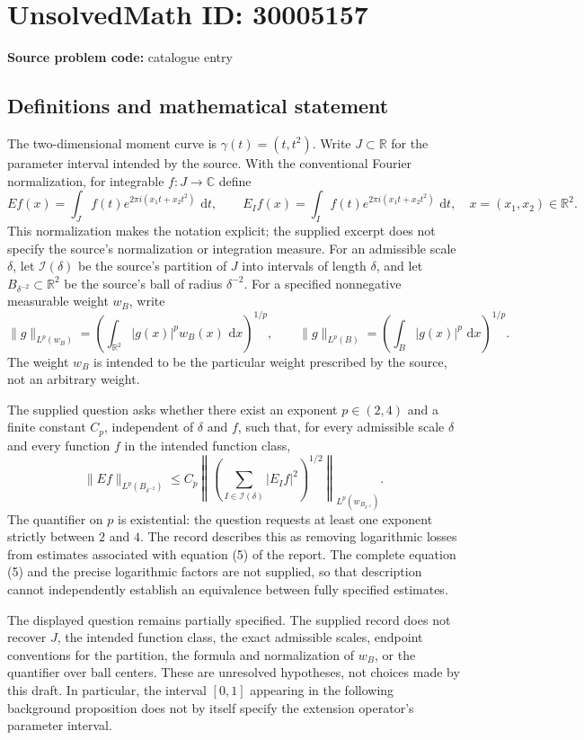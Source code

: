 \documentclass[11pt]{article}
\newcommand{\R}{\mathbb{R}}
\newcommand{\C}{\mathbb{C}}
\newcommand{\dd}{\,\mathrm{d}}
\begin{document}
\section*{UnsolvedMath ID: 30005157}
\textbf{Source problem code:} catalogue entry
\subsection{Definitions and mathematical statement}
The two-dimensional moment curve is \(\gamma(t)=(t,t^2)\). Write \(J\subset\R\) for the parameter interval intended by the source. With the conventional Fourier normalization, for integrable \(f:J\to\C\) define
\[
Ef(x)=\int_J f(t)e^{2\pi i(x_1t+x_2t^2)}\,\dd t,
\qquad
E_If(x)=\int_I f(t)e^{2\pi i(x_1t+x_2t^2)}\,\dd t,
\quad x=(x_1,x_2)\in\R^2.
\]
This normalization makes the notation explicit; the supplied excerpt does not specify the source's normalization or integration measure. For an admissible scale \(\delta\), let \(\mathcal I(\delta)\) be the source's partition of \(J\) into intervals of length \(\delta\), and let \(B_{\delta^{-2}}\subset\R^2\) be the source's ball of radius \(\delta^{-2}\). For a specified nonnegative measurable weight \(w_B\), write
\[
\|g\|_{L^p(w_B)}=\left(\int_{\R^2}|g(x)|^p w_B(x)\,\dd x\right)^{1/p},
\qquad
\|g\|_{L^p(B)}=\left(\int_B|g(x)|^p\,\dd x\right)^{1/p}.
\]
The weight \(w_B\) is intended to be the particular weight prescribed by the source, not an arbitrary weight.

The supplied question asks whether there exist an exponent \(p\in(2,4)\) and a finite constant \(C_p\), independent of \(\delta\) and \(f\), such that, for every admissible scale \(\delta\) and every function \(f\) in the intended function class,
\[
\|Ef\|_{L^p(B_{\delta^{-2}})}
\leq C_p
\left\|\left(\sum_{I\in\mathcal I(\delta)}|E_If|^2\right)^{1/2}\right\|_{L^p(w_{B_{\delta^{-2}}})}.
\]
The quantifier on \(p\) is existential: the question requests at least one exponent strictly between \(2\) and \(4\). The record describes this as removing logarithmic losses from estimates associated with equation (5) of the report. The complete equation (5) and the precise logarithmic factors are not supplied, so that description cannot independently establish an equivalence between fully specified estimates.

The displayed question remains partially specified. The supplied record does not recover \(J\), the intended function class, the exact admissible scales, endpoint conventions for the partition, the formula and normalization of \(w_B\), or the quantifier over ball centers. These are unresolved hypotheses, not choices made by this draft. In particular, the interval \([0,1]\) appearing in the following background proposition does not by itself specify the extension operator's parameter interval.
\end{document}
